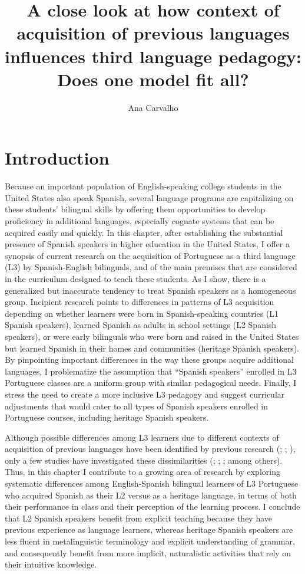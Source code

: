 \documentclass[output=paper]{../langscibook}
\author{Ana Carvalho\affiliation{University of Arizona}}
\title{A close look at how context of acquisition of previous languages influences third language pedagogy: Does one model fit all?}
\begin{document}
 \section{Introduction}

Because an important population of English-speaking college students in the United States also speak Spanish, several language programs are capitalizing on these students’ bilingual skills by offering them opportunities to develop proficiency in additional languages, especially cognate systems that can be acquired easily and quickly. In this chapter, after establishing the substantial presence of Spanish speakers in higher education in the United States, I offer a synopsis of current research on the acquisition of Portuguese as a third language (L3) by Spanish-English bilinguals, and of the main premises that are considered in the curriculum designed to teach these students. As I show, there is a generalized but inaccurate tendency to treat Spanish speakers as a homogeneous group. Incipient research points to differences in patterns of L3 acquisition depending on whether learners were born in Spanish-speaking countries (L1 Spanish speakers), learned Spanish as adults in school settings (L2 Spanish speakers), or were early bilinguals who were born and raised in the United States but learned Spanish in their homes and communities (heritage Spanish speakers). By pinpointing important differences in the way these groups acquire additional languages, I problematize the assumption that “Spanish speakers” enrolled in L3 Portuguese classes are a uniform group with similar pedagogical needs. Finally, I stress the need to create a more inclusive L3 pedagogy and suggest curricular adjustments that would cater to all types of Spanish speakers enrolled in Portuguese courses, including heritage Spanish speakers.

Although possible differences among L3 learners due to different contexts of acquisition of previous languages have been identified by previous research (\citealt{Carvalho2002}; \citealt{Cenoz2011}; \citealt{Johnson2004}), only a few studies have investigated these dissimilarities (\citealt{CarvalhoChild2018}; \citealt{CarvalhoSilva2006}; \citealt{Child2014}; among others). Thus, in this chapter I contribute to a growing area of research by exploring systematic differences among English-Spanish bilingual learners of L3 Portuguese who acquired Spanish as their L2 versus as a heritage language, in terms of both their performance in class and their perception of the learning process. I conclude that L2 Spanish speakers benefit from explicit teaching because they have previous experience as language learners, whereas heritage Spanish speakers are less fluent in metalinguistic terminology and explicit understanding of grammar, and consequently benefit from more implicit, naturalistic activities that rely on their intuitive knowledge.
\end{document}

